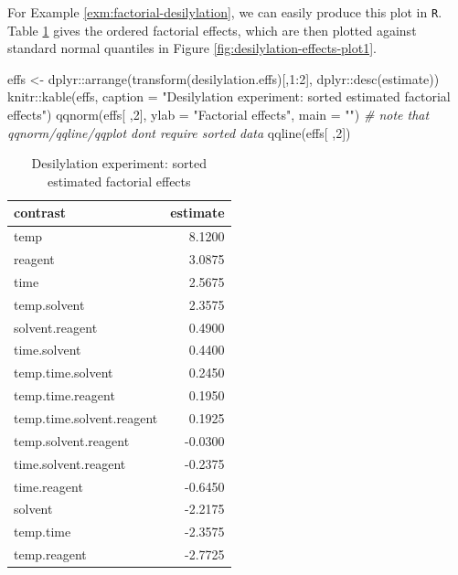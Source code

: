 \documentclass[
]{book}
\newenvironment{Shaded}{\begin{snugshade}}{\end{snugshade}}
\newcommand{\AttributeTok}[1]{\textcolor[rgb]{0.77,0.63,0.00}{#1}}
\newcommand{\CommentTok}[1]{\textcolor[rgb]{0.56,0.35,0.01}{\textit{#1}}}
\newcommand{\DecValTok}[1]{\textcolor[rgb]{0.00,0.00,0.81}{#1}}
\newcommand{\FunctionTok}[1]{\textcolor[rgb]{0.00,0.00,0.00}{#1}}
\newcommand{\NormalTok}[1]{#1}
\newcommand{\OtherTok}[1]{\textcolor[rgb]{0.56,0.35,0.01}{#1}}
\newcommand{\SpecialCharTok}[1]{\textcolor[rgb]{0.00,0.00,0.00}{#1}}
\newcommand{\StringTok}[1]{\textcolor[rgb]{0.31,0.60,0.02}{#1}}
\theoremstyle{definition}
\theoremstyle{definition}
\theoremstyle{definition}
\theoremstyle{definition}
\theoremstyle{remark}
\begin{document}
For Example \ref{exm:factorial-desilylation}, we can easily produce this plot in \texttt{R}. Table \ref{tab:desilylation-effects-plot1} gives the ordered factorial effects, which are then plotted against standard normal quantiles in Figure \ref{fig:desilylation-effects-plot1}.

\begin{Shaded}
\begin{Highlighting}[]
\NormalTok{effs }\OtherTok{\textless{}{-}}\NormalTok{ dplyr}\SpecialCharTok{::}\FunctionTok{arrange}\NormalTok{(}\FunctionTok{transform}\NormalTok{(desilylation.effs)[,}\DecValTok{1}\SpecialCharTok{:}\DecValTok{2}\NormalTok{], dplyr}\SpecialCharTok{::}\FunctionTok{desc}\NormalTok{(estimate))}
\NormalTok{knitr}\SpecialCharTok{::}\FunctionTok{kable}\NormalTok{(effs, }\AttributeTok{caption =} \StringTok{"Desilylation experiment: sorted estimated factorial effects"}\NormalTok{)}
\FunctionTok{qqnorm}\NormalTok{(effs[ ,}\DecValTok{2}\NormalTok{], }\AttributeTok{ylab =} \StringTok{"Factorial effects"}\NormalTok{, }\AttributeTok{main =} \StringTok{""}\NormalTok{) }\CommentTok{\# note that qqnorm/qqline/qqplot don\textquotesingle{}t require sorted data}
\FunctionTok{qqline}\NormalTok{(effs[ ,}\DecValTok{2}\NormalTok{])}
\end{Highlighting}
\end{Shaded}

\begin{table}

\caption{\label{tab:desilylation-effects-plot1}Desilylation experiment: sorted estimated factorial effects}
\centering
\begin{tabular}[t]{l|r}
\hline
contrast & estimate\\
\hline
temp & 8.1200\\
\hline
reagent & 3.0875\\
\hline
time & 2.5675\\
\hline
temp.solvent & 2.3575\\
\hline
solvent.reagent & 0.4900\\
\hline
time.solvent & 0.4400\\
\hline
temp.time.solvent & 0.2450\\
\hline
temp.time.reagent & 0.1950\\
\hline
temp.time.solvent.reagent & 0.1925\\
\hline
temp.solvent.reagent & -0.0300\\
\hline
time.solvent.reagent & -0.2375\\
\hline
time.reagent & -0.6450\\
\hline
solvent & -2.2175\\
\hline
temp.time & -2.3575\\
\hline
temp.reagent & -2.7725\\
\hline
\end{tabular}
\end{table}
\end{document}
